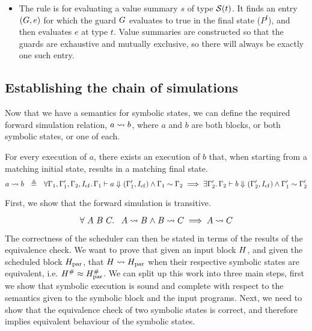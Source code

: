 {\begin{itemize}
\item The  rule is for evaluating a value summary $s$ of
  type $\mathcal{S}(t)$. It finds an entry $(G,e)$ for which the guard
  $G$ evaluates to true in the final state ($P^{\mathrm{f}}$), and then
  evaluates $e$ at type $t$. Value summaries are constructed so that the guards
  are exhaustive and mutually exclusive, so there will always be exactly one
  such entry.
\end{itemize}

\subsection{Establishing the chain of simulations}

Now that we have a semantics for symbolic states, we can define the required
forward simulation relation, $a \mathrel{\leadsto} b$, where $a$ and $b$ are both blocks, or
both symbolic states, or one of each.

\begin{definition}
  For every execution of $a$, there exists an execution of $b$ that,
  when starting from a matching initial state, results in a matching final state.
  \begin{equation}
      a \curly b\ \ \defeq\ \ \forall\context_1, \context_1',
        \context_2, \cfinstr\ldotp
        \sem{}{\context_1}{a}{(\context_1', \cfinstr)} \land
        \context_1 \sim \context_2 \implies
      \exists\context_2'\ldotp \sem{}{\context_2}{b}{(\context_2', \cfinstr)}
 \land \context_1' \sim \context_2'\\
  \end{equation}
\end{definition}

First, we show that the forward simulation is transitive.

\begin{lemma}\label{thm:transitivity}
  {\normalfont\begin{equation}
    \label{eq:1}
    \forall\ A\ B\ C\ldotp\ \ A \mathrel{\leadsto} B \mathrel{\land} B \mathrel{\leadsto} C \implies A \mathrel{\leadsto} C
  \end{equation}}
\end{lemma}

The correctness of the scheduler can then be stated in terms of the results of
the equivalence check.  We want to prove that given an input block $H$, and
given the scheduled block $H_\text{par}$, that $H \mathrel{\leadsto} H_\text{par}$ when their
respective symbolic states are equivalent,
i.e. $H^{\#} \approx H_\text{par}^{\#}$.  We can split up this
work into three main steps, first we show that symbolic execution is sound and
complete with respect to the semantics given to the symbolic block and the input
programs.  Next, we need to show that the equivalence check of two symbolic
states is correct, and therefore implies equivalent behaviour of the symbolic
states.

}
